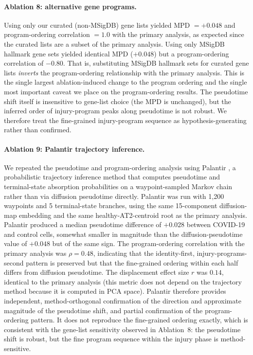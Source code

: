 \documentclass[11pt]{article}
\begin{document}
\paragraph{Ablation 8: alternative gene programs.} Using only our curated (non-MSigDB) gene lists yielded MPD $= +0.048$ and program-ordering correlation $= 1.0$ with the primary analysis, as expected since the curated lists are a subset of the primary analysis. Using only MSigDB hallmark gene sets yielded identical MPD ($+0.048$) but a program-ordering correlation of $-0.80$. That is, substituting MSigDB hallmark sets for curated gene lists \emph{inverts} the program-ordering relationship with the primary analysis. This is the single largest ablation-induced change to the program ordering and the single most important caveat we place on the program-ordering results. The pseudotime shift itself is insensitive to gene-list choice (the MPD is unchanged), but the inferred order of injury-program peaks along pseudotime is not robust. We therefore treat the fine-grained injury-program sequence as hypothesis-generating rather than confirmed.

\paragraph{Ablation 9: Palantir trajectory inference.} We repeated the pseudotime and program-ordering analysis using Palantir \citep{Setty2019}, a probabilistic trajectory inference method that computes pseudotime and terminal-state absorption probabilities on a waypoint-sampled Markov chain rather than via diffusion pseudotime directly. Palantir was run with 1{,}200 waypoints and 5 terminal-state branches, using the same 15-component diffusion-map embedding and the same healthy-AT2-centroid root as the primary analysis. Palantir produced a median pseudotime difference of $+0.028$ between COVID-19 and control cells, somewhat smaller in magnitude than the diffusion-pseudotime value of $+0.048$ but of the same sign. The program-ordering correlation with the primary analysis was $\rho = 0.48$, indicating that the identity-first, injury-programs-second pattern is preserved but that the fine-grained ordering within each half differs from diffusion pseudotime. The displacement effect size $r$ was $0.14$, identical to the primary analysis (this metric does not depend on the trajectory method because it is computed in PCA space). Palantir therefore provides independent, method-orthogonal confirmation of the direction and approximate magnitude of the pseudotime shift, and partial confirmation of the program-ordering pattern. It does not reproduce the fine-grained ordering exactly, which is consistent with the gene-list sensitivity observed in Ablation~8: the pseudotime shift is robust, but the fine program sequence within the injury phase is method-sensitive.
\end{document}
